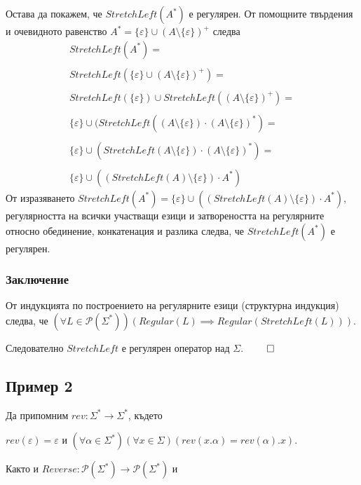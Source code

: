 \documentclass[12pt]{article}
\begin{document}
\par Остава да покажем, че \(StretchLeft(A^*)\) е регулярен.
От помощните твърдения и очевидното равенство \(A^* = \{\varepsilon\} \cup (A \setminus \{\varepsilon\})^+\) следва
\begin{align*}
    StretchLeft(A^*) = \\\\
    StretchLeft(\{\varepsilon\} \cup (A \setminus \{\varepsilon\})^+) = \\\\
    StretchLeft(\{\varepsilon\}) \cup  StretchLeft((A \setminus \{\varepsilon\})^+) = \\\\
    \{\varepsilon\} \cup (StretchLeft((A \setminus \{\varepsilon\}) \cdot (A \setminus \{\varepsilon\})^*) = \\\\
    \{\varepsilon\} \cup (StretchLeft(A \setminus \{\varepsilon\}) \cdot (A \setminus \{\varepsilon\})^*) = \\\\
    \{\varepsilon\} \cup ((StretchLeft(A) \setminus \{\varepsilon\}) \cdot A^*)
\end{align*}
От изразяването \(StretchLeft(A^*) = \{\varepsilon\} \cup ((StretchLeft(A) \setminus \{\varepsilon\}) \cdot A^*)\), \\
регулярността на всички участващи езици и затвореността на регулярните относно обединение, конкатенация и разлика следва,
че \(StretchLeft(A^*)\) е регулярен.

\subsubsection*{Заключение}
От индукцията по построението на регулярните езици (структурна индукция) следва, че
\((\forall L \in \mathcal{P}(\Sigma^*))(Regular(L) \implies Regular(StretchLeft(L)))\).

Следователно \(StretchLeft\) е регулярен оператор над \(\Sigma\). \(\qed\)

\subsection*{Пример 2}
Да припомним \(rev : \Sigma^* \to \Sigma^*\), където

\(rev(\varepsilon) = \varepsilon\) и \((\forall \alpha \in \Sigma^*)(\forall x \in \Sigma)(rev(x.\alpha) = rev(\alpha).x)\).

Както и \(Reverse : \mathcal{P}(\Sigma^*) \to \mathcal{P}(\Sigma^*)\) и
\end{document}
